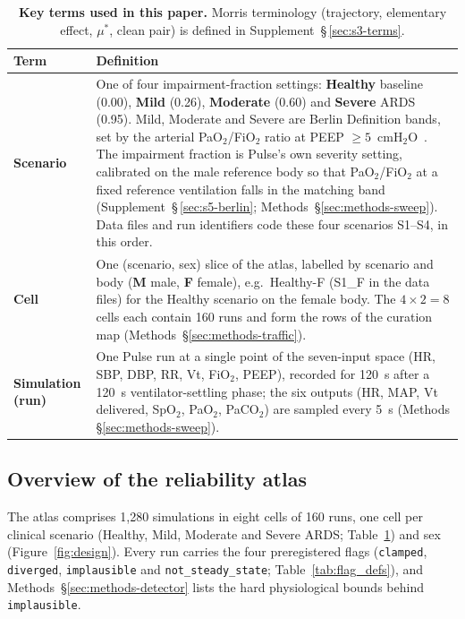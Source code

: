 \documentclass[pdflatex,sn-nature]{sn-jnl}%
\begin{document}
\begin{table}[!h]
\centering
\caption{\textbf{Key terms used in this paper.} Morris terminology (trajectory, elementary effect, $\mu^{*}$, clean pair) is defined in Supplement~\S\,\ref{sec:s3-terms}.}
\label{tab:terms}
\begin{tabular}{lp{}}
\toprule
Term & Definition \\
\midrule
\textbf{Scenario} & One of four impairment-fraction settings: \textbf{Healthy} baseline (0.00), \textbf{Mild} (0.26), \textbf{Moderate} (0.60) and \textbf{Severe} ARDS (0.95). Mild, Moderate and Severe are Berlin Definition bands, set by the arterial PaO$_2$/FiO$_2$ ratio at PEEP $\geq 5$~cmH$_2$O~\cite{ards2012}. The impairment fraction is Pulse's own severity setting, calibrated on the male reference body so that PaO$_2$/FiO$_2$ at a fixed reference ventilation falls in the matching band (Supplement~\S\,\ref{sec:s5-berlin}; Methods~\S\ref{sec:methods-sweep}). Data files and run identifiers code these four scenarios S1--S4, in this order. \\
\addlinespace
\textbf{Cell} & One (scenario, sex) slice of the atlas, labelled by scenario and body (\textbf{M} male, \textbf{F} female), e.g.\ Healthy-F (S1\_F in the data files) for the Healthy scenario on the female body. The $4 \times 2 = 8$ cells each contain 160 runs and form the rows of the curation map (Methods~\S\ref{sec:methods-traffic}). \\
\addlinespace
\textbf{Simulation (run)} & One Pulse run at a single point of the seven-input space (HR, SBP, DBP, RR, Vt, FiO$_2$, PEEP), recorded for 120~s after a 120~s ventilator-settling phase; the six outputs (HR, MAP, Vt delivered, SpO$_2$, PaO$_2$, PaCO$_2$) are sampled every 5~s (Methods \S\ref{sec:methods-sweep}). \\
\bottomrule
\end{tabular}
\end{table}

\subsection{Overview of the reliability atlas}\label{sec:results-overview}

The atlas comprises 1{,}280 simulations in eight cells of 160 runs, one cell per clinical scenario (Healthy, Mild, Moderate and Severe ARDS; Table~\ref{tab:terms}) and sex (Figure~\ref{fig:design}). Every run carries the four preregistered flags (\texttt{clamped}, \texttt{diverged}, \texttt{implausible} and \texttt{not\_steady\_state}; Table~\ref{tab:flag_defs}), and Methods~\S\ref{sec:methods-detector} lists the hard physiological bounds behind \texttt{implausible}.
\end{document}
